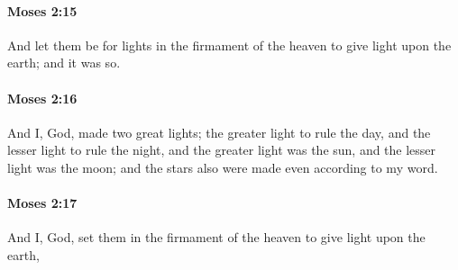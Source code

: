 		\paragraph{Moses 2:15} %
			\label{MOSES-2-15}

			And let them be for lights in the firmament of the heaven to give light upon the earth; and it was so.


		\paragraph{Moses 2:16} %
			\label{MOSES-2-16}

			And I, God, made two great lights; the greater light to rule the day, and the lesser light to rule the night, and the greater light was the sun, and the lesser light was the moon; and the stars also were made even according to my word.


		\paragraph{Moses 2:17} %
			\label{MOSES-2-17}

			And I, God, set them in the firmament of the heaven to give light upon the earth,


